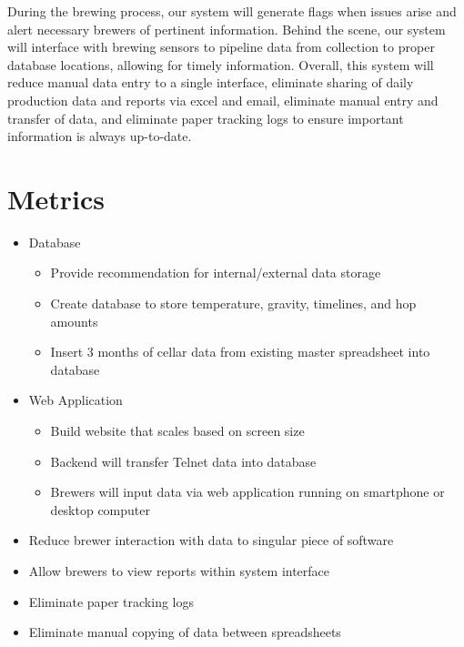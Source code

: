 \documentclass[draftclsnofoot,onecolumn,letterpaper,10pt]{IEEEtran}
\begin{document}
During the brewing process, our system will generate flags when issues arise and alert necessary brewers of pertinent information. Behind the scene, our system will interface with brewing sensors to pipeline data from collection to proper database locations, allowing for timely information. Overall, this system will reduce manual data entry to a single interface, eliminate sharing of daily production data and reports via excel and email, eliminate manual entry and transfer of data, and eliminate paper tracking logs to ensure important information is always up-to-date.

\section{\textbf{Metrics}}
\begin{itemize}
\item {Database}
\begin{itemize}
\item {Provide recommendation for internal/external data storage}
\item {Create database to store temperature, gravity, timelines, and hop amounts}
\item {Insert 3 months of cellar data from existing master spreadsheet into database}
\end{itemize}
\item{Web Application}
\begin{itemize}
\item {Build website that scales based on screen size}
\item {Backend will transfer Telnet data into database}
\item {Brewers will input data via web application running on smartphone or desktop computer}
\end{itemize}



\item {Reduce brewer interaction with data to singular piece of software}
\item {Allow brewers to view reports within system interface}
\item {Eliminate paper tracking logs}
\item {Eliminate manual copying of data between spreadsheets}
\end{itemize}
\end{document}
